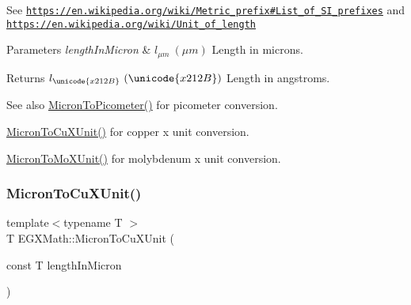See \href{https://en.wikipedia.org/wiki/Metric_prefix#List_of_SI_prefixes}{\tt https\+://en.\+wikipedia.\+org/wiki/\+Metric\+\_\+prefix\#\+List\+\_\+of\+\_\+\+S\+I\+\_\+prefixes} and \href{https://en.wikipedia.org/wiki/Unit_of_length}{\tt https\+://en.\+wikipedia.\+org/wiki/\+Unit\+\_\+of\+\_\+length} 
\begin{DoxyParams}{Parameters}
{\em length\+In\+Micron} & $ l_{\mu m}\ (\mu m)$ Length in microns. \\
\hline
\end{DoxyParams}
\begin{DoxyReturn}{Returns}
$ l_{\unicode{x212B}}\ (\unicode{x212B})$ Length in angstroms. 
\end{DoxyReturn}
\begin{DoxySeeAlso}{See also}
\mbox{\hyperlink{group___e_g_x_math-_conversions-_length_conversions-_non-_s_i-_micron-_s_i_ga6e091e653fd9efb8769cc131fcbc41bc}{Micron\+To\+Picometer()}} for picometer conversion. 

\mbox{\hyperlink{group___e_g_x_math-_conversions-_length_conversions-_non-_s_i-_micron-_non-_s_i_gaa582745d86b8b016faa9ad442b18ce8f}{Micron\+To\+Cu\+X\+Unit()}} for copper x unit conversion. 

\mbox{\hyperlink{group___e_g_x_math-_conversions-_length_conversions-_non-_s_i-_micron-_non-_s_i_ga4bdfec28657cb037fc0830a95ceb79ca}{Micron\+To\+Mo\+X\+Unit()}} for molybdenum x unit conversion. 
\end{DoxySeeAlso}
\mbox{\label{group___e_g_x_math-_conversions-_length_conversions-_non-_s_i-_micron-_non-_s_i_gaa582745d86b8b016faa9ad442b18ce8f}} 
\subsubsection{\texorpdfstring{Micron\+To\+Cu\+X\+Unit()}{MicronToCuXUnit()}}
{\footnotesize\ttfamily template$<$typename T $>$ \\
T E\+G\+X\+Math\+::\+Micron\+To\+Cu\+X\+Unit (\begin{DoxyParamCaption}\item[{const T}]{length\+In\+Micron }\end{DoxyParamCaption})}



